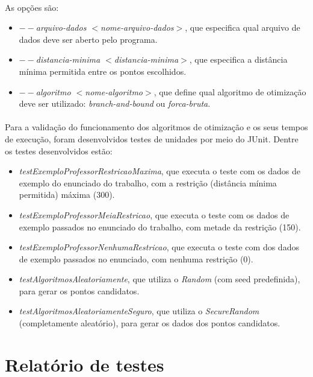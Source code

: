 \documentclass[12pt]{article}
\begin{document}
\paragraph{}As opções são:

\begin{itemize}
    \item \textit{$--$arquivo-dados $<$nome-arquivo-dados$>$}, que especifica qual arquivo de dados deve ser aberto pelo programa.
    \item \textit{$--$distancia-minima $<$distancia-minima$>$}, que especifica a distância mínima permitida entre os pontos escolhidos.
    \item \textit{$--$algoritmo $<$nome-algoritmo$>$}, que define qual algoritmo de otimização deve ser utilizado: \textit{branch-and-bound} ou \textit{forca-bruta}.
\end{itemize}

\paragraph{}Para a validação do funcionamento dos algoritmos de otimização e os seus tempos de execução, foram desenvolvidos testes de unidades por meio do JUnit. Dentre os testes desenvolvidos estão:

\begin{itemize}
    \item \textit{testExemploProfessorRestricaoMaxima}, que executa o teste com os dados de exemplo do enunciado do trabalho, com a restrição (distância mínima permitida) máxima (300).
    \item \textit{testExemploProfessorMeiaRestricao}, que executa o teste com os dados de exemplo passados no enunciado do trabalho, com metade da restrição (150).
    \item \textit{testExemploProfessorNenhumaRestricao}, que executa o teste com dos dados de exemplo passados no enunciado, com nenhuma restrição (0).
    \item \textit{testAlgoritmosAleatoriamente}, que utiliza o \textit{Random} (com seed predefinida), para gerar os pontos candidatos.
    \item \textit{testAlgoritmosAleatoriamenteSeguro}, que utiliza o \textit{SecureRandom} (completamente aleatório), para gerar os dados dos pontos candidatos.
\end{itemize}

\section{Relatório de testes}
\end{document}
